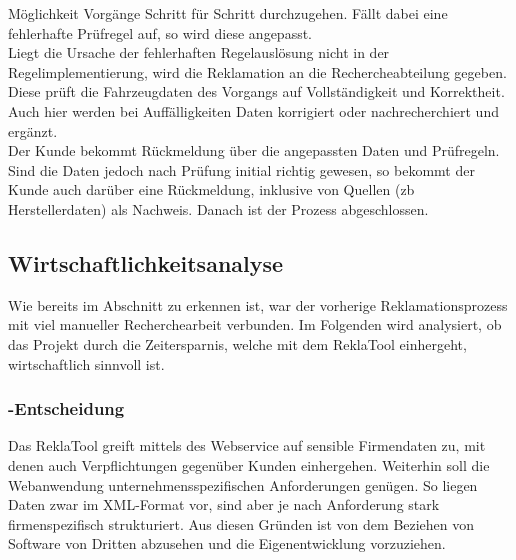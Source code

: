 Möglichkeit Vorgänge Schritt für Schritt durchzugehen. Fällt dabei eine fehlerhafte Prüfregel auf, so wird diese angepasst.\\
Liegt die Ursache der fehlerhaften Regelauslösung nicht in der Regelimplementierung, wird die Reklamation an die Rechercheabteilung 
gegeben. Diese prüft die Fahrzeugdaten des Vorgangs auf Vollständigkeit und Korrektheit. Auch hier werden bei Auffälligkeiten Daten 
korrigiert oder nachrecherchiert und ergänzt.\\
Der Kunde bekommt Rückmeldung über die angepassten Daten und Prüfregeln. 
Sind die Daten jedoch nach Prüfung initial richtig gewesen, so bekommt der Kunde auch darüber eine Rückmeldung, 
inklusive von Quellen (\acs{zb} Herstellerdaten) als Nachweis.
Danach ist der Prozess abgeschlossen.


\subsection{Wirtschaftlichkeitsanalyse}
\label{sec:Wirtschaftlichkeitsanalyse}
Wie bereits im Abschnitt  zu erkennen ist, war der vorherige Reklamationsprozess
mit viel manueller Recherchearbeit verbunden. Im Folgenden wird analysiert, ob das Projekt durch die Zeitersparnis,
welche mit dem ReklaTool einhergeht, wirtschaftlich sinnvoll ist. 


\subsubsection{-Entscheidung}
\label{sec:MakeOrBuyEntscheidung}
Das ReklaTool greift mittels des Webservice auf sensible Firmendaten zu, mit denen auch Verpflichtungen gegenüber
Kunden einhergehen. Weiterhin soll die Webanwendung unternehmensspezifischen Anforderungen genügen.
So liegen Daten zwar im \acs{XML}-Format vor, sind aber je nach Anforderung stark firmenspezifisch strukturiert.
Aus diesen Gründen ist von dem Beziehen von Software von Dritten abzusehen und die Eigenentwicklung vorzuziehen.


